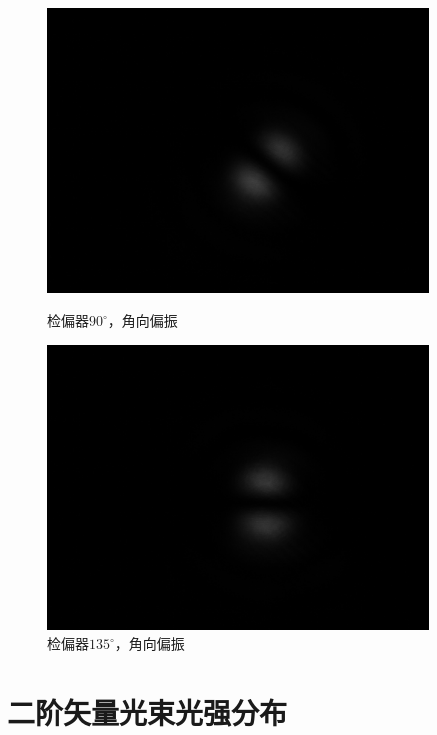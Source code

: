 \documentclass[a4paper,UTF8]{ctexart}
\begin{document}
\begin{figure}[H]
    \centering
    \begin{minipage}[b]{0.45\textwidth}
        \centering
        \includegraphics[width=0.9\textwidth]{./fig/1_7.png}
        \caption{检偏器$90^{\circ}$，角向偏振}
    \end{minipage}
    \begin{minipage}[b]{0.45\textwidth}
        \centering
        \includegraphics[width=0.9\textwidth]{./fig/1_6.png}
        \caption{检偏器$135^{\circ}$，角向偏振}
    \end{minipage}
\end{figure}

\section{二阶矢量光束光强分布}
\end{document}
